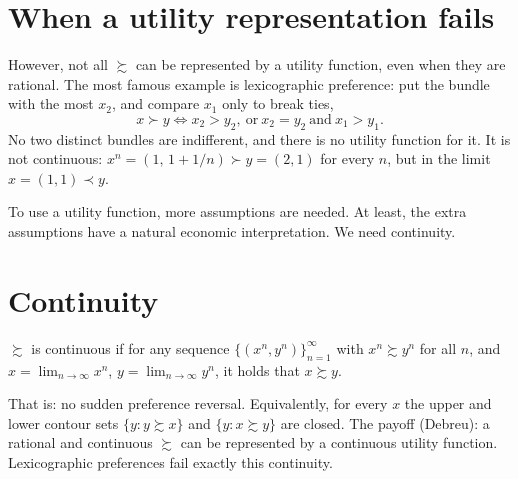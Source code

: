 \documentclass[11pt]{article}
\begin{document}
\section{When a utility representation fails}

However, not all $\succsim$ can be represented by a utility function, even when
they are rational. The most famous example is lexicographic preference: put the
bundle with the most $x_2$, and compare $x_1$ only to break ties,
\[ x\succ y \iff x_2>y_2,\ \text{or}\ x_2=y_2\ \text{and}\ x_1>y_1 . \]
No two distinct bundles are indifferent, and there is no utility function for it.
It is not continuous: $x^n=(1,\,1+1/n)\succ y=(2,1)$ for every $n$, but in the limit
$x=(1,1)\prec y$.

To use a utility function, more assumptions are needed. At least, the extra
assumptions have a natural economic interpretation. We need continuity.


\section{Continuity}

 $\succsim$ is continuous if for any sequence
$\{(x^n,y^n)\}_{n=1}^{\infty}$ with $x^n\succsim y^n$ for all $n$, and
$x=\lim_{n\to\infty}x^n$, $y=\lim_{n\to\infty}y^n$, it holds that
$x\succsim y$.

That is: no sudden preference reversal. Equivalently, for every $x$ the upper and
lower contour sets $\{y:y\succsim x\}$ and $\{y:x\succsim y\}$ are closed. The payoff
(Debreu): a rational and continuous $\succsim$ can be represented by a continuous
utility function. Lexicographic preferences fail exactly this continuity.
\end{document}
